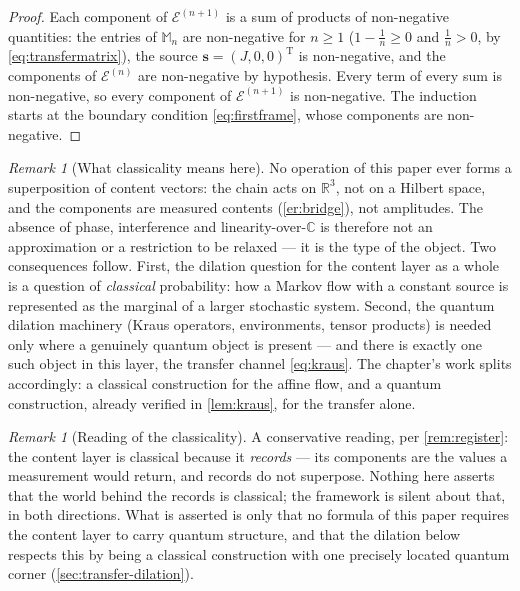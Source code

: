 \documentclass[11pt]{amsbook}
\theoremstyle{plain}
\theoremstyle{definition}
\theoremstyle{remark}
\newtheorem{remark}[theorem]{Remark}
\begin{document}
\begin{proof}
Each component of $\boldsymbol{\mathcal E}^{(n+1)}$ is a sum of products of non-negative quantities: the entries of $\mathbb{M}_{n}$ are non-negative for $n \geq 1$ ($1 - \tfrac1n \geq 0$ and $\tfrac1n > 0$, by \cref{eq:transfermatrix}), the source $\boldsymbol{s} = (J, 0, 0)^{\mathrm T}$ is non-negative, and the components of $\boldsymbol{\mathcal E}^{(n)}$ are non-negative by hypothesis. Every term of every sum is non-negative, so every component of $\boldsymbol{\mathcal E}^{(n+1)}$ is non-negative. The induction starts at the boundary condition \cref{eq:firstframe}, whose components are non-negative.
\end{proof}

\begin{remark}[What classicality means here]\label{rem:what-dilation}
No operation of this paper ever forms a superposition of content vectors: the chain acts on $\mathbb{R}^{3}$, not on a Hilbert space, and the components are measured contents (\cref{er:bridge}), not amplitudes. The absence of phase, interference and linearity-over-$\mathbb{C}$ is therefore not an approximation or a restriction to be relaxed --- it is the type of the object. Two consequences follow. First, the dilation question for the content layer as a whole is a question of \emph{classical} probability: how a Markov flow with a constant source is represented as the marginal of a larger stochastic system. Second, the quantum dilation machinery (Kraus operators, environments, tensor products) is needed only where a genuinely quantum object is present --- and there is exactly one such object in this layer, the transfer channel \cref{eq:kraus}. The chapter's work splits accordingly: a classical construction for the affine flow, and a quantum construction, already verified in \cref{lem:kraus}, for the transfer alone.
\end{remark}

\begin{remark}[Reading of the classicality]\label{rem:classicality-reading}
A conservative reading, per \cref{rem:register}: the content layer is classical because it \emph{records} --- its components are the values a measurement would return, and records do not superpose. Nothing here asserts that the world behind the records is classical; the framework is silent about that, in both directions. What is asserted is only that no formula of this paper requires the content layer to carry quantum structure, and that the dilation below respects this by being a classical construction with one precisely located quantum corner (\cref{sec:transfer-dilation}).
\end{remark}
\end{document}
